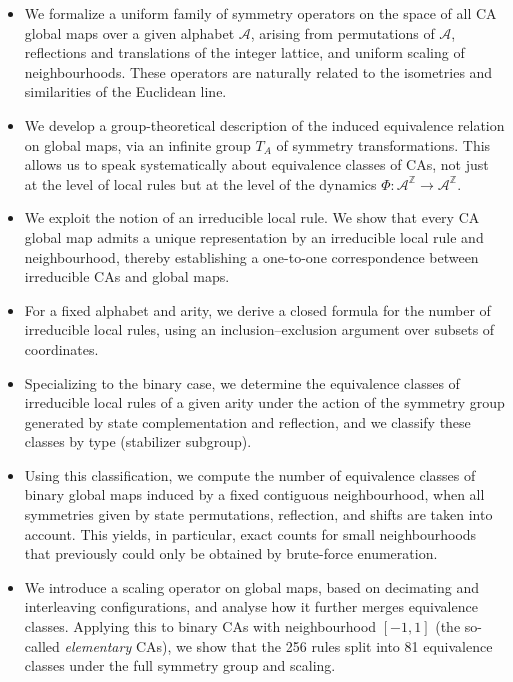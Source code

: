 \documentclass[a4paper]{article}
\begin{document}
\begin{itemize}
  \item We formalize a uniform family of symmetry operators on the space of all
        CA global maps over a given alphabet $\mathcal{A}$, arising from permutations
        of $\mathcal{A}$, reflections and translations of the integer lattice, and uniform
        scaling of neighbourhoods. These operators are naturally related to the
        isometries and similarities of the Euclidean line.

  \item We develop a group-theoretical description of the induced equivalence
        relation on global maps, via an infinite group $T_{A}$ of symmetry
        transformations. This allows us to speak systematically about
        equivalence classes of CAs, not just at the level of local rules but at
        the level of the dynamics $\Phi : \mathcal{A}^{\mathbb{Z}} \to \mathcal{A}^{\mathbb{Z}}$.

  \item We exploit the notion of an irreducible local rule. We
        show that every CA global map admits a unique representation by an
        irreducible local rule and neighbourhood, thereby establishing a one-to-one
        correspondence between irreducible CAs and global maps.

  \item For a fixed alphabet and arity, we derive a closed formula for the
        number of irreducible local rules, using an inclusion--exclusion argument
        over subsets of coordinates.

  \item Specializing to the binary case, we determine the equivalence classes of
        irreducible local rules of a given arity under the action of the symmetry
        group generated by state complementation and reflection, and we classify
        these classes by type (stabilizer subgroup).

  \item Using this classification, we compute the number of equivalence classes
        of binary global maps induced by a fixed contiguous neighbourhood, when
        all symmetries given by state permutations, reflection, and shifts are
        taken into account. This yields, in particular, exact counts for small
        neighbourhoods that previously could only be obtained by brute-force
        enumeration.

  \item We introduce a scaling operator on global maps, based on decimating
        and interleaving configurations, and analyse how it further merges
        equivalence classes. Applying this to binary CAs with neighbourhood
        $[-1,1]$ (the so-called \emph{elementary} CAs), we show that the
        256 rules split into 81 equivalence classes under the full symmetry
        group and scaling.
\end{itemize}
\end{document}
